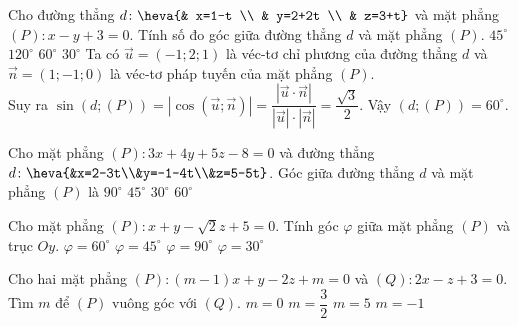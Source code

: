 \begin{ex}%
	Cho đường thẳng $d\colon \heva{& x=1-t \\ & y=2+2t \\ & z=3+t}$ và mặt phẳng $(P)\colon x-y+3=0$. Tính số đo góc giữa đường thẳng $d$ và mặt phẳng $(P)$.
	\choice
	{$45^\circ$}
	{$120^\circ$}
	{\True $60^\circ$}
	{$30^\circ$}
	\loigiai
	{
		Ta có $\vec {u}=(-1;2;1)$ là véc-tơ chỉ phương của đường thẳng $d$ và $\vec{n}=(1;-1;0)$ là véc-tơ pháp tuyến của mặt phẳng $(P)$.\\
		Suy ra $\sin \left(d;(P)\right)=\left|\cos \left(\vec{u};\vec{n}\right)\right|=\dfrac{\left|\vec{u} \cdot \vec{n}\right|}{|\vec{u}|\cdot |\vec{n}|}=\dfrac{\sqrt{3}}{2}$. Vậy $(d;(P))=60^\circ$.
	}
\end{ex}
\begin{ex}
	Cho mặt phẳng $(P)\colon 3x+4y+5z-8=0$ và đường thẳng $d\colon\heva{&x=2-3t\\&y=-1-4t\\&z=5-5t}$. Góc giữa đường thẳng $d$ và mặt phẳng $(P)$ là
	\choice
	{\True $90^{\circ}$}
	{$45^{\circ}$}
	{$30^{\circ}$}
	{$60^{\circ}$}
\end{ex}
\begin{ex}
	Cho mặt phẳng $(P)\colon x+y-\sqrt{2}z+5=0$. Tính góc $\varphi$ giữa mặt phẳng $(P)$ và trục $Oy$.
	\choice
	{$\varphi=60^{\circ}$}
	{$\varphi=45^{\circ}$}
	{$\varphi=90^{\circ}$}
	{\True $\varphi=30^{\circ}$}
\end{ex}
\begin{ex}
	Cho hai mặt phẳng $(P)\colon (m-1)x+y-2z+m=0$ và $(Q)\colon 2x-z+3=0.$ Tìm $m$ để $(P)$ vuông góc với $(Q).$
	\choice
	{\True $m=0$}
	{$m=\dfrac32$}
	{$m=5$}
	{$m=-1$}
\end{ex}

